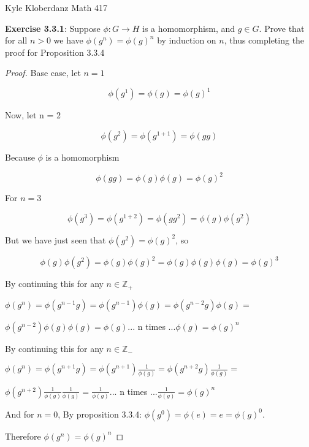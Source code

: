 \documentclass[a4paper]{article}
\begin{document}
\begin{myparindent}{0pt}

Kyle Kloberdanz \newline
Math 417 \newline

\textbf{Exercise 3.3.1}:
Suppose $\phi: G \rightarrow H$ is a homomorphism, and $g \in G$. Prove that
for all $n > 0$ we have $\phi(g^n) = \phi(g)^n$ by induction on $n$, thus
completing the proof for Proposition 3.3.4
\newline

\begin{proof}

Base case, let $n = 1$

\[ \phi(g^1) = \phi(g) = \phi(g)^1 \]

Now, let n = 2

\[ \phi(g^2) = \phi(g^{1 + 1}) = \phi(gg) \]

Because $\phi$ is a homomorphism

\[ \phi(gg) = \phi(g) \phi(g) = \phi(g)^2 \]

For $n = 3$

\[ \phi(g^3) = \phi(g^{1 + 2}) = \phi(gg^2) = \phi(g) \phi(g^2) \]

But we have just seen that $\phi(g^2) = \phi(g)^2$, so

\[ \phi(g) \phi(g^2) = \phi(g) \phi(g)^2 = \phi(g) \phi(g) \phi(g) = \phi(g)^3 \]

By continuing this for any $n \in \mathbb{Z_{+}}$

$\phi(g^n) = \phi(g^{n - 1}g) = \phi(g^{n - 1}) \phi(g) = \phi(g^{n - 2}g) \phi(g) =$

$\phi(g^{n-2}) \phi(g) \phi(g) = \phi(g) ...$ n times $... \phi(g) = \phi(g)^n$
\newline

By continuing this for any $n \in \mathbb{Z_{-}}$

$\phi(g^n) = \phi(g^{n + 1}g) = \phi(g^{n + 1}) \frac{1}{\phi(g)} = \phi(g^{n + 2}g) \frac{1}{\phi(g)} =$

$\phi(g^{n+2}) \frac{1}{\phi(g)} \frac{1}{\phi(g)} = \frac{1}{\phi(g)} ...$ n times $... \frac{1}{\phi(g)} = \phi(g)^n$
\newline

And for $n = 0$, By proposition 3.3.4: $\phi(g^0) = \phi(e) = e = \phi(g)^0$.
\newline

Therefore $\phi(g^n) = \phi(g)^n$
\end{proof}


\end{myparindent}
\end{document}
